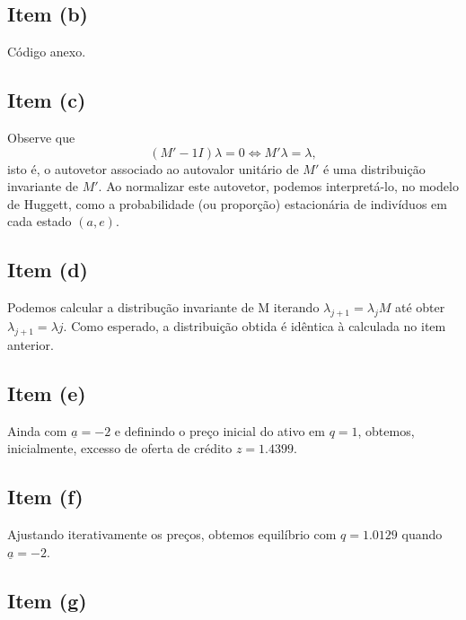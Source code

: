 \documentclass{article}
\begin{document}
\subsection*{Item (b)}



Código anexo.



\subsection*{Item (c)}



Observe que $$(M' - 1I) \lambda = 0 \iff M' \lambda = \lambda,$$ isto é, o autovetor associado ao autovalor unitário de $M'$ é uma distribuição invariante de $M'$. Ao normalizar este autovetor, podemos interpretá-lo, no modelo de Huggett, como a probabilidade (ou proporção) estacionária de indivíduos em cada estado $(a, e)$.



\subsection*{Item (d)}



Podemos calcular a distribução invariante de M iterando $\lambda_{j+1} = \lambda_j M$ até obter $\lambda_{j+1} = \lambda{j}$. Como esperado, a distribuição obtida é idêntica à calculada no item anterior.



\subsection*{Item (e)}



Ainda com $\underline{a} = -2$ e definindo o preço inicial do ativo em $q = 1$, obtemos, inicialmente, excesso de oferta de crédito $z =1.4399$.



\subsection*{Item (f)}



Ajustando iterativamente os preços, obtemos equilíbrio com $q = 1.0129$ quando $\underline{a} = -2$.



\subsection*{Item (g)}
\end{document}
